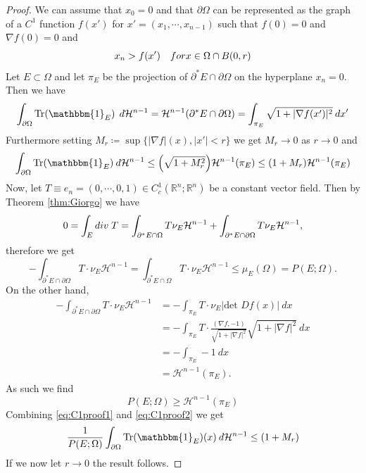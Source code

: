 \documentclass[10pt,a4paper]{amsart}
\DeclareMathOperator{\Tr}{Tr}
\newcommand{\Hd}{\mathcal{H}}
\newcommand{\R}{\mathbb{R}}
\newcommand{\contvf}{C^1_c(\R^n; \R^n)}
\newcommand{\dd}{\: d}
\newcommand{\divv}{\textnormal{div} \;}
\newcommand{\ind}{\mathbbm{1}}
\newcommand{\pom}{{\partial \Omega}}
\begin{document}
	\begin{proof}
		We can assume that $x_0=0$ and that $\pom$ can be represented as the graph of a $C^1$ function $f(x')$ for $x'=(x_1, \cdots, x_{n-1})$ such that $f(0)=0$ and $\nabla f(0) = 0$ and
		\[
		x_n > f(x') \quad \textnormal{ for } x \in \Omega \cap B(0,r) 
		\]
		Let $E \subset \Omega$ and let $\pi_E$ be the projection of  $\partial^\ast E \cap \pom$ on the hyperplane $x_n=0$. Then we have 
		\begin{equation*}
			\int_{\pom} \Tr(\ind_E) \: \dd \Hd^{n-1} = \Hd^{n-1}(\partial^\ast E \cap \pom) = \int_{\pi_E} \sqrt{1+|\nabla f(x')|^2} \dd x'
		\end{equation*}
		Furthermore setting $M_r \coloneqq \sup \{|\nabla f|(x), |x'| < r \}$ we get $M_r \rightarrow 0$ as $r \rightarrow 0$ and 
		\begin{equation} \label{eq:C1proof1}
			\int_\pom \Tr(\ind_E) \dd \Hd^{n-1} \leq
			\Bigl(\sqrt{1+M_r^2}\Bigr)\Hd^{n-1}(\pi_E)
			\leq
			(1+M_r)\Hd^{n-1}(\pi_E)
		\end{equation} 
		Now, let $T  \equiv e_n = (0, \cdots, 0, 1) \in \contvf$ be a constant vector field. Then by Theorem \ref{thm:Giorgo} we have
		\[
		0 = \int_E \divv T = \int_{\partial^\ast E \cap \Omega} T \nu_E \Hd^{n-1} + \int_{\partial^\ast E \cap \partial \Omega} T \nu_E \Hd^{n-1},  
		\]
		therefore  we get 
		\[
		- \int_{\partial^\ast E \cap \partial \Omega} T \cdot \nu_E \Hd^{n-1} = \int_{\partial^\ast E \cap \Omega} T \cdot \nu_E \Hd^{n-1} \leq \mu_E(\Omega) = P(E;\Omega). 
		\]
		On the other hand, 
		\begin{align*}
			-\int_{\partial^\ast E \cap \partial \Omega} T \cdot \nu_E \Hd^{n-1} &= -\int_{\pi_E} T \cdot \nu_E |\text{det } Df(x)| \dd x \\
			&= -\int_{\pi_E} T \cdot \frac{(\nabla f, -1)}{\sqrt{1+|\nabla f|^2}} \sqrt{1+|\nabla f|^2} \dd x \\
			&= - \int_{\pi_E} -1 \dd x \\
			&= \Hd^{n-1}(\pi_E).
		\end{align*}
		As such we find
		\begin{equation} \label{eq:C1proof2}
			P(E;\Omega) \geq \Hd^{n-1}(\pi_E)
		\end{equation}
		Combining \eqref{eq:C1proof1} and \eqref{eq:C1proof2} we get
		\begin{equation}
			\frac{1}{P(E;\Omega)} \int_\pom \Tr(\ind_E)(x) \dd\Hd^{n-1} \leq (1+M_r)
		\end{equation}
		If we now let $r \rightarrow 0$ the result follows.
	\end{proof}
\end{document}
